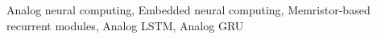 \begin{keywords}
  Analog neural computing, Embedded neural computing, Memristor-based recurrent modules, Analog LSTM, Analog GRU
\end{keywords}
\clearpage
\thispagestyle{empty}
\cleardoublepage
